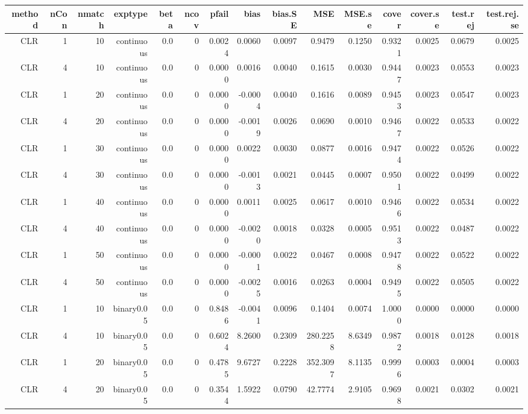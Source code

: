 \begingroup\scriptsize
\begin{longtable}{rrrrrrrrrrrrrrr}
  \toprule
method & nCon & nmatch & exptype & beta & ncov & pfail & bias & bias.SE & MSE & MSE.se & cover & cover.se & test.rej & test.rej.se \\ 
  \midrule
CLR & 1 & 10 & continuous & 0.0 & 0 & 0.0024 & 0.0060 & 0.0097 & 0.9479 & 0.1250 & 0.9321 & 0.0025 & 0.0679 & 0.0025 \\ 
  CLR & 4 & 10 & continuous & 0.0 & 0 & 0.0000 & 0.0016 & 0.0040 & 0.1615 & 0.0030 & 0.9447 & 0.0023 & 0.0553 & 0.0023 \\ 
  CLR & 1 & 20 & continuous & 0.0 & 0 & 0.0000 & -0.0004 & 0.0040 & 0.1616 & 0.0089 & 0.9453 & 0.0023 & 0.0547 & 0.0023 \\ 
  CLR & 4 & 20 & continuous & 0.0 & 0 & 0.0000 & -0.0019 & 0.0026 & 0.0690 & 0.0010 & 0.9467 & 0.0022 & 0.0533 & 0.0022 \\ 
  CLR & 1 & 30 & continuous & 0.0 & 0 & 0.0000 & 0.0022 & 0.0030 & 0.0877 & 0.0016 & 0.9474 & 0.0022 & 0.0526 & 0.0022 \\ 
  CLR & 4 & 30 & continuous & 0.0 & 0 & 0.0000 & -0.0013 & 0.0021 & 0.0445 & 0.0007 & 0.9501 & 0.0022 & 0.0499 & 0.0022 \\ 
  CLR & 1 & 40 & continuous & 0.0 & 0 & 0.0000 & 0.0011 & 0.0025 & 0.0617 & 0.0010 & 0.9466 & 0.0022 & 0.0534 & 0.0022 \\ 
  CLR & 4 & 40 & continuous & 0.0 & 0 & 0.0000 & -0.0020 & 0.0018 & 0.0328 & 0.0005 & 0.9513 & 0.0022 & 0.0487 & 0.0022 \\ 
  CLR & 1 & 50 & continuous & 0.0 & 0 & 0.0000 & -0.0001 & 0.0022 & 0.0467 & 0.0008 & 0.9478 & 0.0022 & 0.0522 & 0.0022 \\ 
  CLR & 4 & 50 & continuous & 0.0 & 0 & 0.0000 & -0.0025 & 0.0016 & 0.0263 & 0.0004 & 0.9495 & 0.0022 & 0.0505 & 0.0022 \\ 
  CLR & 1 & 10 & binary0.05 & 0.0 & 0 & 0.8486 & -0.0041 & 0.0096 & 0.1404 & 0.0074 & 1.0000 & 0.0000 & 0.0000 & 0.0000 \\ 
  CLR & 4 & 10 & binary0.05 & 0.0 & 0 & 0.6024 & 8.2600 & 0.2309 & 280.2258 & 8.6349 & 0.9872 & 0.0018 & 0.0128 & 0.0018 \\ 
  CLR & 1 & 20 & binary0.05 & 0.0 & 0 & 0.4785 & 9.6727 & 0.2228 & 352.3097 & 8.1135 & 0.9996 & 0.0003 & 0.0004 & 0.0003 \\ 
  CLR & 4 & 20 & binary0.05 & 0.0 & 0 & 0.3544 & 1.5922 & 0.0790 & 42.7774 & 2.9105 & 0.9698 & 0.0021 & 0.0302 & 0.0021 \\ 

\end{longtable}
